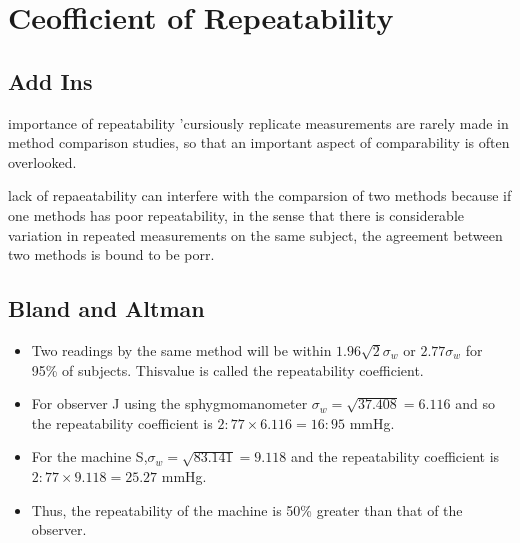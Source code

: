 \documentclass[12pt, a4paper]{article}
\begin{document}

\chapter{Ceofficient of Repeatability}


\section{Add Ins}
importance of repeatability
'cursiously replicate measurements are rarely made in method comparison studies, so that an important aspect of comparability is 
often overlooked.

lack of repaeatability can interfere with the comparsion of two methods because if one methods has poor repeatability, in the sense that there is
considerable variation in repeated measurements on the same subject, the agreement between two methods is bound to be porr.



\section{Bland and Altman}
\begin{itemize}
\item Two readings by the same method will be within $1.96
\sqrt{2} \sigma_w $ or $2.77 \sigma_w $ for 95\% of subjects. Thisvalue is called the repeatability coefficient.

\item For observer J using the sphygmomanometer $ \sigma_w = \sqrt{37.408} = 6.116$ and so the repeatability coefficient is
$2:77 \times 6.116 = 16:95$ mmHg.

\item For the machine S,$ \sigma_w = \sqrt{83.141} = 9.118$ and the repeatability coefficient is $2:77 \times 9.118 = 25.27$ mmHg.

\item Thus, the repeatability of the machine is 50\% greater than that of the observer.
\end{itemize}
\end{document}
